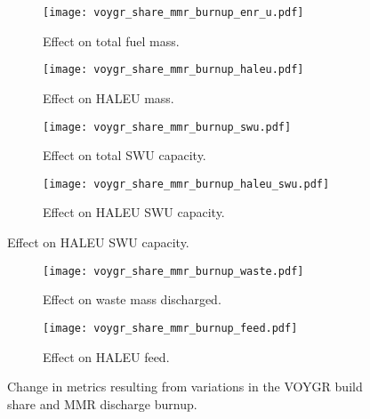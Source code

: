 \begin{figure}
    \begin{subfigure}[b]{0.48\textwidth}
        \centering
        \texttt{[image: voygr\_share\_mmr\_burnup\_enr\_u.pdf]}
        \caption{Effect on total fuel mass.}
        \label{fig:voygr_share_mmr_burnupenr_u}
    \end{subfigure}
    \hfill
    \begin{subfigure}[b]{0.48\textwidth}
        \centering
        \texttt{[image: voygr\_share\_mmr\_burnup\_haleu.pdf]}
        \caption{Effect on HALEU mass.}
        \label{fig:voygr_share_mmr_burnup_haleu}
    \end{subfigure}
    
    \begin{subfigure}[b]{0.48\textwidth}
        \centering
        \texttt{[image: voygr\_share\_mmr\_burnup\_swu.pdf]}
        \caption{Effect on total SWU capacity.}
        \label{fig:voygr_share_mmr_burnup_swu}
    \end{subfigure}
    \hfill
    \begin{subfigure}[b]{0.48\textwidth}
        \centering
        \texttt{[image: voygr\_share\_mmr\_burnup\_haleu\_swu.pdf]}
        \caption{Effect on HALEU SWU capacity.}
        \label{fig:voygr_share_mmr_burnup_haleu_swu}
    \end{subfigure}
\end{figure}

\begin{figure}
    \ContinuedFloat    
    \begin{subfigure}[b]{0.48\textwidth}
        \centering
        \texttt{[image: voygr\_share\_mmr\_burnup\_waste.pdf]}
        \caption{Effect on waste mass discharged.}
        \label{fig:voygr_share_mmr_burnup_waste}
    \end{subfigure}
    \hfill
    \begin{subfigure}[b]{0.48\textwidth}
        \centering
        \texttt{[image: voygr\_share\_mmr\_burnup\_feed.pdf]}
        \caption{Effect on HALEU feed.}
        \label{fig:voygr_share_mmr_burnup_feed}
    \end{subfigure}
    \caption{Change in metrics resulting from variations in the 
    VOYGR build share and MMR discharge burnup.}
    \label{fig:voygr_share_mmr_burnup}
\end{figure}
